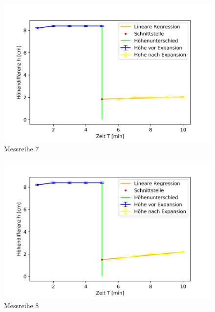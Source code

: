 \documentclass[bibliography=totocnumbered]{scrartcl}
\begin{document}
\begin{figure}[!ht]
	\centering									%
	\includegraphics[width=400pt]{fotos/gpr1/Temperaturkorrektor 3. Messung.png}			%
	\caption{Messreihe 7}							%
	\label{Abb: Sara 3}							%
\end{figure}
\begin{figure}[!ht]
	\centering									%
	\includegraphics[width=400pt]{fotos/gpr1/Temperaturkorrektor 4. Messung.png}			%
	\caption{Messreihe 8}							%
	\label{Abb: Sara 4}							%
\end{figure}	
		
	

	\newpage
	\printbibliography[title={Quellenverzeichnis}]
	
	
\end{document}
